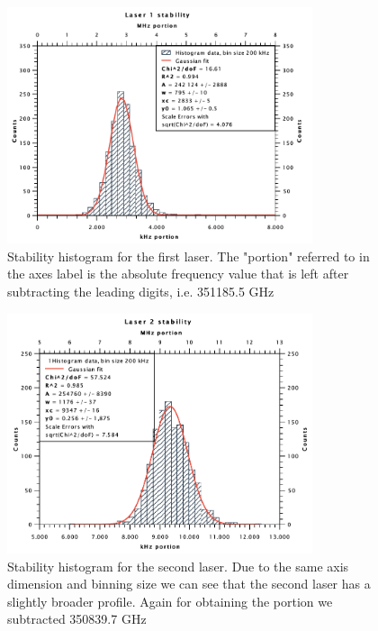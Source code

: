 \documentclass[a4paper,10pt]{scrartcl}
\begin{document}
\begin{figure}[H]
\centering
\includegraphics[width=0.8\textwidth]{img/laser1stab}
\caption{Stability histogram for the first laser. The "portion" referred to in the axes label is the absolute frequency value that is left after subtracting the leading digits, i.e. 351185.5 GHz}
\label{fig:laser1}
\end{figure}

\begin{figure}[H]
\centering
\includegraphics[width=0.8\textwidth]{img/laser2stab}
\caption{Stability histogram for the second laser. Due to the same axis dimension and binning size we can see that the second laser has a slightly broader profile. Again for obtaining the portion we subtracted 350839.7 GHz}
\label{fig:laser2}
\end{figure}
\end{document}

